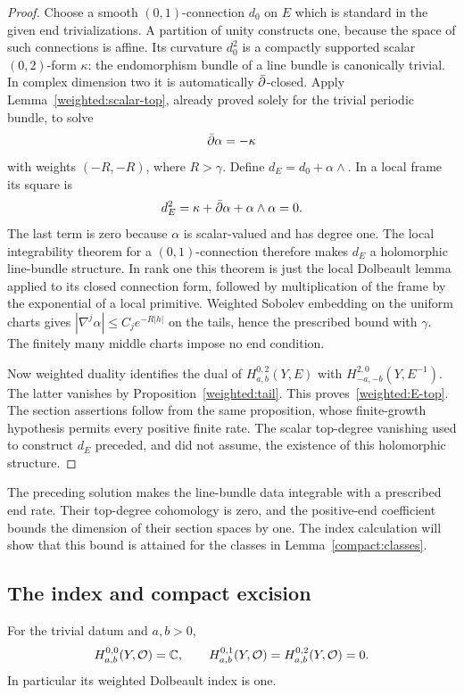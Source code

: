 \begin{proof}
Choose a smooth $(0,1)$-connection $d_0$ on $E$ which is standard in the
given end trivializations. A partition of unity constructs one, because
the space of such connections is affine. Its curvature $d_0^2$ is a
compactly supported scalar $(0,2)$-form $\kappa$: the endomorphism
bundle of a line bundle is canonically trivial. In complex dimension
two it is automatically $\bar\partial$-closed. Apply
Lemma~\ref{weighted:scalar-top}, already proved solely for the trivial
periodic bundle, to solve
\[
 \bar\partial\alpha=-\kappa
\]
with weights $(-R,-R)$, where $R>\gamma$. Define
$d_E=d_0+\alpha\wedge$. In a local frame its square is
\[
 d_E^2=\kappa+\bar\partial\alpha+\alpha\wedge\alpha=0.
\]
The last term is zero because $\alpha$ is scalar-valued and has degree
one. The local integrability theorem for a $(0,1)$-connection therefore
makes $d_E$ a holomorphic line-bundle structure. In rank one this
theorem is just the local Dolbeault lemma applied to its closed
connection form, followed by multiplication of the frame by the
exponential of a local primitive. Weighted Sobolev embedding on the
uniform charts gives
$|\nabla^j\alpha|\le C_j e^{-R|h|}$ on the tails, hence the prescribed
bound with $\gamma$. The finitely many middle charts impose no end
condition.

Now weighted duality identifies the dual of
$H^{0,2}_{a,b}(Y,E)$ with
$H^{2,0}_{-a,-b}(Y,E^{-1})$. The latter vanishes by
Proposition~\ref{weighted:tail}. This proves~\eqref{weighted:E-top}.
The section assertions follow from the same proposition, whose
finite-growth hypothesis permits every positive finite rate. The scalar
top-degree vanishing used to construct $d_E$ preceded, and did not
assume, the existence of this holomorphic structure.
\end{proof}

The preceding solution makes the line-bundle data integrable with a
prescribed end rate. Their top-degree cohomology is zero, and the
positive-end coefficient bounds the dimension of their section spaces
by one. The index calculation will show that this bound is attained
for the classes in Lemma~\ref{compact:classes}.

\subsection{The index and compact excision}

\begin{lemma}\label{weighted:base-index}
For the trivial datum and $a,b>0$,
\[
 H^{0,0}_{a,b}(Y,\mathcal O)=\mathbb C,
 \qquad H^{0,1}_{a,b}(Y,\mathcal O)=H^{0,2}_{a,b}(Y,\mathcal O)=0.
\]
In particular its weighted Dolbeault index is one.
\end{lemma}

